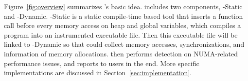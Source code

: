 Figure~\ref{fig:overview} summarizes \NP{}'s basic idea.  \NP{} includes two components, \NP{}-Static and \NP{}-Dynamic. \NP{}-Static is a static compile-time based tool that inserts a function call before every memory access on heap and global variables, which compiles a program into an instrumented executable file. Then this executable file will be linked to \NP{}-Dynamic so that \NP{} could collect memory accesses, synchronizations, and information of memory allocations. \NP{} then performs detection on NUMA-related performance issues, and reports to users in the end.  More specific implementations are discussed in Section~\ref{sec:implementation}. 
